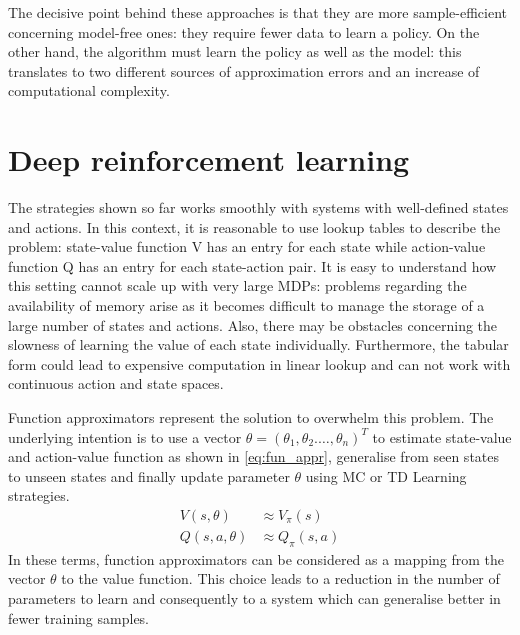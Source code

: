 The decisive point behind these approaches is that they are more sample-efficient concerning model-free ones: they require fewer data to learn a policy. On the other hand, the algorithm must learn the policy as well as the model: this translates to two different sources of approximation errors and an increase of computational complexity.

\section{Deep reinforcement learning} \label{deepreinflearn}



The strategies shown so far works smoothly with systems with well-defined states and actions. In this context, it is reasonable to use lookup tables to describe the problem: state-value function V has an entry for each state while action-value function Q has an entry for each state-action pair.
It is easy to understand how this setting cannot scale up with very large MDPs: problems regarding the availability of memory arise as it becomes difficult to manage the storage of a large number of states and actions. Also, there may be obstacles concerning the slowness of learning the value of each state individually. Furthermore, the tabular form could lead to expensive computation in linear lookup and can not work with continuous action and state spaces.

Function approximators represent the solution to overwhelm this problem. The underlying intention is to use a vector $\theta = (\theta_1, \theta_2. \dots, \theta_n)^T$ to estimate state-value and action-value function as shown in \vref{eq:fun_appr}, generalise from seen states to unseen states and finally update parameter $\theta$ using MC or TD Learning strategies.
\begin{equation}\label{eq:fun_appr}
	\begin{aligned}
		V(s, \theta)    & \approx V_\pi(s)   \\
		Q(s, a, \theta) & \approx Q_\pi(s,a)
	\end{aligned}
\end{equation}
In these terms, function approximators can be considered as a mapping from the vector $\theta$ to the value function.
This choice leads to a reduction in the number of parameters to learn and consequently to a system which can generalise better in fewer training samples.

